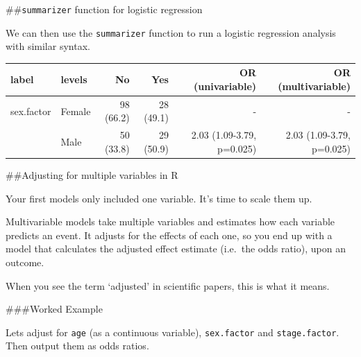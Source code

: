 \documentclass[]{book}
\makeatletter
\newenvironment{Shaded}{\begin{snugshade}}{\end{snugshade}}
\newcommand{\KeywordTok}[1]{\textcolor[rgb]{0.13,0.29,0.53}{\textbf{#1}}}
\newcommand{\NormalTok}[1]{#1}
\newcommand{\OperatorTok}[1]{\textcolor[rgb]{0.81,0.36,0.00}{\textbf{#1}}}
\newcommand{\StringTok}[1]{\textcolor[rgb]{0.31,0.60,0.02}{#1}}
\newenvironment{kframe}{%
\medskip{}
\setlength{\fboxsep}{.8em}
 \def\at@end@of@kframe{}%
 \ifinner\ifhmode%
  \def\at@end@of@kframe{\end{minipage}}%
  \begin{minipage}{\columnwidth}%
 \fi\fi%
 \def\FrameCommand##1{\hskip\@totalleftmargin \hskip-\fboxsep
 \colorbox{shadecolor}{##1}\hskip-\fboxsep
     \hskip-\linewidth \hskip-\@totalleftmargin \hskip\columnwidth}%
 \MakeFramed {\advance\hsize-\width
   \@totalleftmargin\z@ \linewidth\hsize
   \@setminipage}}%
 {\par\unskip\endMakeFramed%
 \at@end@of@kframe}
\renewenvironment{Shaded}{\begin{kframe}}{\end{kframe}}
\theoremstyle{definition}
\theoremstyle{definition}
\theoremstyle{definition}
\theoremstyle{remark}
\makeatother
\begin{document}
\#\#\texttt{summarizer} function for logistic regression

We can then use the \texttt{summarizer} function to run a logistic
regression analysis with similar syntax.

\begin{Shaded}
\end{Shaded}

\begin{tabular}{l|l|r|r|r|r}
\hline
label & levels & No & Yes & OR (univariable) & OR (multivariable)\\
\hline
sex.factor & Female & 98 (66.2) & 28 (49.1) & - & -\\
\hline
 & Male & 50 (33.8) & 29 (50.9) & 2.03 (1.09-3.79, p=0.025) & 2.03 (1.09-3.79, p=0.025)\\
\hline
\end{tabular}

\newpage

\#\#Adjusting for multiple variables in R

Your first models only included one variable. It's time to scale them
up.

Multivariable models take multiple variables and estimates how each
variable predicts an event. It adjusts for the effects of each one, so
you end up with a model that calculates the adjusted effect estimate
(i.e.~the odds ratio), upon an outcome.

When you see the term `adjusted' in scientific papers, this is what it
means.

\#\#\#Worked Example

Lets adjust for \texttt{age} (as a continuous variable),
\texttt{sex.factor} and \texttt{stage.factor}. Then output them as odds
ratios.

\begin{Shaded}
\end{Shaded}
\end{document}
